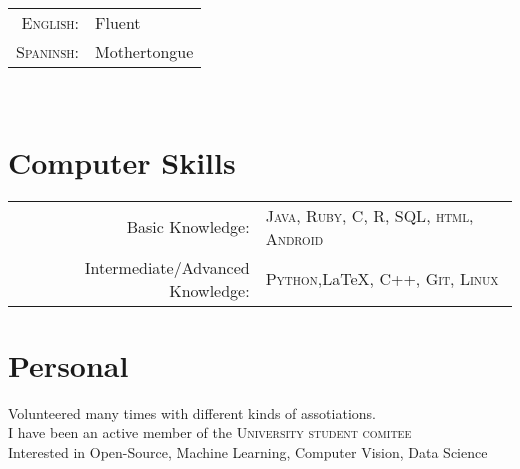 \documentclass[a4paper,11pt]{article} %
\begin{document}
\begin{tabular}{rl}
\textsc{English:} & Fluent\\

\textsc{Spaninsh:} & Mothertongue\\
\end{tabular}\\


\section{Computer Skills}

\begin{tabular}{rl}
Basic Knowledge: & \textsc{Java}, \textsc{Ruby}, \textsc{C}, \textsc{R}, \textsc{SQL}, \textsc{html}, \textsc{Android}\\

Intermediate/Advanced Knowledge: & \textsc{Python},\LaTeX, \textsc{C++}, \textsc{Git}, \textsc{Linux}\\


\end{tabular}


\section{Personal}

Volunteered many times with different kinds of assotiations.\\
I have been an active member of the \textsc{University student comitee}\\
Interested in Open-Source, Machine Learning, Computer Vision, Data Science
\end{document}
